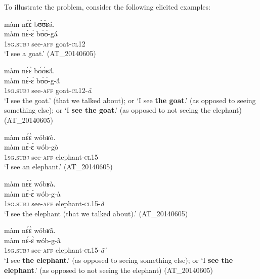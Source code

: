 \documentclass[output=paper]{langsci/langscibook}
\begin{document}
To illustrate the problem, consider the following elicited examples:

\ea\label{ex:teo:1}
\glll màm n\'ɛ\`ɛ b\'ʊ\'ʊʁá.{\rmfnm}\\
màm n\'ɛ-\`ɛ b\'ʊ\'ʊ-gá\\
1\textsc{sg.subj} see-\textsc{aff} goat-\textsc{cl}12  \\
\glt ‘I see a goat.’ (AT\_20140605){\rmfnm}

\z

\addtocounter{footnote}{-1}

\ea\label{ex:teo:2}
\glll màm n\'ɛ\`ɛ b\'ʊ\'ʊʁ\'{ã}.\\
màm n\'ɛ-\`ɛ b\'ʊ\'ʊ-g-\'{ã}\\
\textsc{1sg}.\textsc{subj} see-\textsc{aff} goat-\textsc{cl12}-\textit{ã}\\
\glt ‘I see the goat.’ (that we talked about); or ‘I see \textbf{the goat}.’ (as opposed to seeing something else); or ‘I \textbf{see the goat}.’ (as opposed to not seeing the elephant) (AT\_20140605)
\z

\ea\label{ex:teo:3} 
\glll màm n\'ɛ\`ɛ wóbʁò.\\
màm n{\'ɛ}-{\`ɛ} wób-gò\\
\textsc{1sg.subj} see-\textsc{aff} elephant-\textsc{cl15}\\
\glt  ‘I see an elephant.’ (AT\_20140605)
\z

\ea\label{ex:teo:4}
\glll  màm n\'ɛ\`ɛ wóbʁà.\\
màm n\'ɛ-\`ɛ wób-g-à\\
\textsc{1sg.subj} see-\textsc{aff} elephant-\textsc{cl15-}\textit{à} \\
\glt ‘I see the elephant (that we talked about).’ (AT\_20140605)
\z

\ea\label{ex:teo:5}
\glll  màm n\'ɛ\`ɛ wóbʁ\`{ã}.\\
màm n\'ɛ-\`ɛ wób-g-\`{ã} \\
\textsc{1sg.subj} see-\textsc{aff} elephant-\textsc{cl15-}\textit{ã\'{}} \\
\glt ‘I see \textbf{the elephant}.’ (as opposed to seeing something else); or ‘I \textbf{see the elephant}.’ (as opposed to not seeing the elephant) (AT\_20140605)
\z
\end{document}
